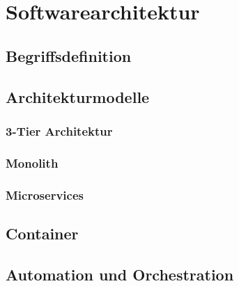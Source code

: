 \newpage
\section{Softwarearchitektur}
\subsection{Begriffsdefinition}
\subsection{Architekturmodelle}
\subsubsection{3-Tier Architektur}
\subsubsection{Monolith}
\subsubsection{Microservices}
\subsection{Container}
\subsection{Automation und Orchestration}
